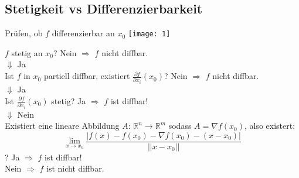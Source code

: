 \subsection{Stetigkeit vs Differenzierbarkeit}


\begin{Rezept}{Prüfen, ob $f$ differenzierbar an $x_0$}{}
    \texttt{[image: 1]}
    
    $f$ stetig an $x_0$? Nein $\Rightarrow$ $f$ nicht diffbar.\\
	$\Downarrow$ Ja\\
	Ist $f$ in $x_0$ partiell diffbar, existiert $\frac{\partial f}{\partial x_i}(x_0)$? Nein $\Rightarrow$ $f$ nicht diffbar.\\
	$\Downarrow$ Ja\\
	Ist $\frac{\partial f}{\partial x_i}(x_0)$ stetig? Ja $\Rightarrow$ $f$ ist diffbar!\\
	$\Downarrow$ Nein\\
	Existiert eine lineare Abbildung $A$: $\mathbb{R}^n \rightarrow \mathbb{R}^m$ sodass $A=\nabla f(x_0)$, also existert:
	\[
    	\lim_{x\rightarrow x_0} \frac{|f(x)-f(x_0)-\nabla f(x_0) - (x-x_0)|}{||x-x_0||}
	\]?
	Ja $\Rightarrow$ $f$ ist diffbar!\\
	Nein $\Rightarrow$ $f$ ist nicht diffbar.
\end{Rezept}
